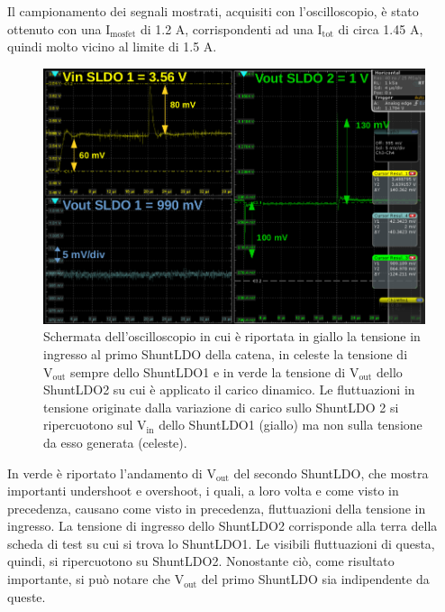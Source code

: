 Il campionamento dei segnali mostrati, acquisiti con l'oscilloscopio, è stato ottenuto con una $\mathrm{I_{mosfet}}$ di 1.2 A, corrispondenti ad una $\mathrm{I_{tot}}$ di circa 1.45 A, quindi molto vicino al limite di 1.5 A. 
\begin{figure}[h!]
\centering
\includegraphics[scale=.32]{Immagini/ScreenSerie}
\caption{Schermata dell'oscilloscopio in cui è riportata in giallo la tensione in ingresso al primo ShuntLDO della catena,  in celeste la tensione di $\mathrm{V_{out}}$ sempre dello ShuntLDO1 e in verde la tensione di $\mathrm{V_{out}}$ dello ShuntLDO2 su cui è applicato il carico dinamico. Le fluttuazioni in tensione originate dalla variazione di carico sullo ShuntLDO 2 si ripercuotono sul $\mathrm{V_{in}}$ dello ShuntLDO1 (giallo) ma non sulla tensione da esso generata (celeste).}
\label{ScreenSerie}
\end{figure}
In verde è riportato l'andamento di $\mathrm{V_{out}}$ del secondo ShuntLDO, che mostra importanti undershoot e overshoot, i quali, a loro volta e come visto in precedenza, causano come visto in precedenza, fluttuazioni della tensione in ingresso. 
La tensione di ingresso dello ShuntLDO2 corrisponde alla terra della scheda di test su cui si trova lo ShuntLDO1.
Le visibili fluttuazioni di questa, quindi, si ripercuotono su ShuntLDO2.
Nonostante ciò, come risultato importante, si può notare che $\mathrm{V_{out}}$ del primo ShuntLDO sia indipendente da queste.
